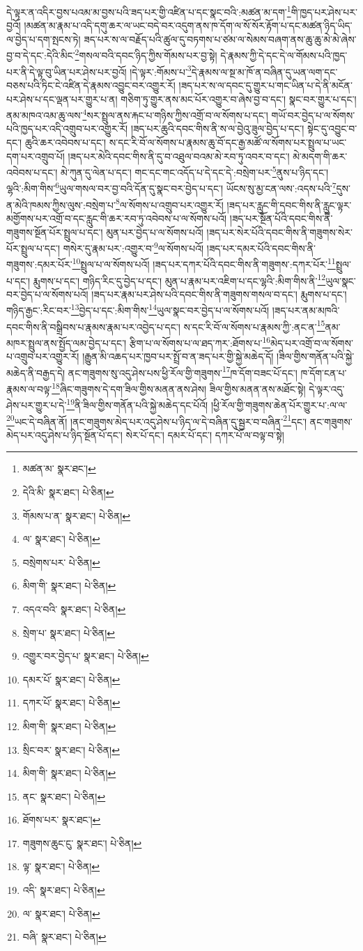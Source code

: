 དེ་ལྟར་ན་འདིར་བྱས་པའམ་མ་བྱས་པའི་ཟད་པར་གྱི་འཛིན་པ་དང་སྣང་བའི་:མཚན་མ་དག་\footnote{མཚན་མ་  སྣར་ཐང་། }གི་ཁྱད་པར་ཤེས་པར་བྱའོ། །མཚན་མ་རྣམ་པ་འདི་དགུ་ཆར་ལ་ཡང་བདེ་བར་འདུག་ནས་ཁ་དོག་ལ་སོ་སོར་རྟོག་པ་དང་མཚན་ཉིད་ཡིད་ལ་བྱེད་པ་དག་སྤངས་ཏེ། ཟད་པར་ས་ལ་བརྗོད་པའི་ཚུལ་དུ་བཏགས་པ་ཙམ་ལ་སེམས་བཞག་ནས་ཆུ་ཆུ་མེ་མེ་ཞེས་བྱ་བ་དེ་དང་:དེའི་མིང་\footnote{དེའི་མི་  སྣར་ཐང་།  པེ་ཅིན། }གསལ་བའི་དབང་ཉིད་ཀྱིས་གོམས་པར་བྱ་སྟེ། དེ་རྣམས་ཀྱི་དེ་དང་དེ་ལ་གོམས་པའི་ཁྱད་པར་ནི་དེ་ལྟ་བུ་ཡིན་པར་ཤེས་པར་བྱའོ། །དེ་ལྟར་:གོམས་པ་\footnote{གོམས་པ་ན་  སྣར་ཐང་།  པེ་ཅིན། }དེ་རྣམས་ལ་སྔ་མ་ཁོ་ན་བཞིན་དུ་ཡན་ལག་དང་བཅས་པའི་ཏིང་ངེ་འཛིན་དེ་རྣམས་འབྱུང་བར་འགྱུར་རོ། །ཟད་པར་ས་ལ་དབང་དུ་གྱུར་པ་གང་ཡིན་པ་དེ་ནི་མངོན་པར་ཤེས་པ་དང་ལྡན་པར་གྱུར་པ་ན། གཅིག་ཏུ་གྱུར་ནས་མང་པོར་འགྱུར་བ་ཞེས་བྱ་བ་དང་། སྣང་བར་གྱུར་པ་དང་། ནམ་མཁའ་འམ་ཆུ་ལས་\footnote{ལ་  སྣར་ཐང་།  པེ་ཅིན། }སར་སྤྲུལ་ནས་རྐང་པ་གཉིས་ཀྱིས་འགྲོ་བ་ལ་སོགས་པ་དང་། གཡོ་བར་བྱེད་པ་ལ་སོགས་པའི་ཁྱད་པར་འདི་འགྲུབ་པར་འགྱུར་རོ། །ཟད་པར་ཆུའི་དབང་གིས་ནི་ས་ལ་བྱེའུ་ཟུལ་བྱེད་པ་དང་། སྟེང་དུ་འབྱུང་བ་དང་། ཆུའི་ཆར་འབེབས་པ་དང་། ས་དང་རི་བོ་ལ་སོགས་པ་རྣམས་ཆུ་བོ་དང་རྒྱ་མཚོ་ལ་སོགས་པར་སྤྲུལ་པ་ཡང་དག་པར་འགྲུབ་པོ། །ཟད་པར་མེའི་དབང་གིས་ནི་དུ་བ་འཐུལ་བའམ་མེ་རབ་ཏུ་འབར་བ་དང་། མེ་མདག་གི་ཆར་འབེབས་པ་དང་། མེ་ཀུན་དུ་ལེན་པ་དང་། གང་དང་གང་འདོད་པ་དེ་དང་དེ་:བསྲེག་པར་\footnote{བསྲེགས་པར་  པེ་ཅིན། }ནུས་པ་ཉིད་དང་། ལྷའི་:མིག་གིས་\footnote{མིག་གི་  སྣར་ཐང་།  པེ་ཅིན། }ཡུལ་གསལ་བར་བྱ་བའི་དོན་དུ་སྣང་བར་བྱེད་པ་དང་། ཡོངས་སུ་མྱ་ངན་ལས་:འདས་པའི་\footnote{འདའ་བའི་  སྣར་ཐང་།  པེ་ཅིན། }དུས་ན་མེའི་ཁམས་ཀྱིས་ལུས་:བསྲེག་པ་\footnote{སྲེག་པ་  སྣར་ཐང་།  པེ་ཅིན། }ལ་སོགས་པ་འགྲུབ་པར་འགྱུར་རོ། །ཟད་པར་རླུང་གི་དབང་གིས་ནི་རླུང་ལྟར་མགྱོགས་པར་འགྲོ་བ་དང་རླུང་གི་ཆར་རབ་ཏུ་འབེབས་པ་ལ་སོགས་པའོ། །ཟད་པར་སྔོན་པོའི་དབང་གིས་ནི་གཟུགས་སྔོན་པོར་སྤྲུལ་པ་དང་། མུན་པར་བྱེད་པ་ལ་སོགས་པའོ། །ཟད་པར་སེར་པོའི་དབང་གིས་ནི་གཟུགས་སེར་པོར་སྤྲུལ་པ་དང་། གསེར་དུ་རྣམ་པར་:འགྱུར་བ་\footnote{འགྱུར་བར་བྱེད་པ་  སྣར་ཐང་།  པེ་ཅིན། }ལ་སོགས་པའོ། །ཟད་པར་དམར་པོའི་དབང་གིས་ནི་གཟུགས་:དམར་པོར་\footnote{དམར་པོ་  སྣར་ཐང་།  པེ་ཅིན། }སྤྲུལ་པ་ལ་སོགས་པའོ། །ཟད་པར་དཀར་པོའི་དབང་གིས་ནི་གཟུགས་:དཀར་པོར་\footnote{དཀར་པོ་  སྣར་ཐང་།  པེ་ཅིན། }སྤྲུལ་པ་དང་། རྨུགས་པ་དང་། གཉིད་རིང་དུ་བྱེད་པ་དང་། མུན་པ་རྣམ་པར་འཇིག་པ་དང་ལྷའི་:མིག་གིས་ནི་\footnote{མིག་གི་  སྣར་ཐང་།  པེ་ཅིན། }ཡུལ་སྣང་བར་བྱེད་པ་ལ་སོགས་པའོ། །ཟད་པར་རྣམ་པར་ཤེས་པའི་དབང་གིས་ནི་གཟུགས་གསལ་བ་དང་། རྨུགས་པ་དང་། གཉིད་རྒྱང་:རིང་བར་\footnote{སྲིང་བར་  སྣར་ཐང་།  པེ་ཅིན། }བྱེད་པ་དང་:མིག་གིས་\footnote{མིག་གི་  སྣར་ཐང་།  པེ་ཅིན། }ཡུལ་སྣང་བར་བྱེད་པ་ལ་སོགས་པའོ། །ཟད་པར་ནམ་མཁའི་དབང་གིས་ནི་བསྒྲིབས་པ་རྣམས་རྣམ་པར་འབྱེད་པ་དང་། ས་དང་རི་བོ་ལ་སོགས་པ་རྣམས་ཀྱི་:ནང་ན་\footnote{ནང་  སྣར་ཐང་།  པེ་ཅིན། }ནམ་མཁར་སྤྲུལ་ནས་སྤྱོད་ལམ་བྱེད་པ་དང་། རྩིག་པ་ལ་སོགས་པ་ལ་ཐད་ཀར་:ཐོགས་པ་\footnote{ཐོགས་པར་  སྣར་ཐང་། }མེད་པར་འགྲོ་བ་ལ་སོགས་པ་འགྲུབ་པར་འགྱུར་རོ། །རྒྱུན་མི་འཆད་པར་ཁྱབ་པར་སྤྲོ་བ་ན་ཟད་པར་གྱི་སྐྱེ་མཆེད་དོ། །ཟིལ་གྱིས་གནོན་པའི་སྐྱེ་མཆེད་ནི་བརྒྱད་དེ། ནང་གཟུགས་སུ་འདུ་ཤེས་པས་ཕྱི་རོལ་གྱི་གཟུགས་\footnote{གཟུགས་ཆུང་ངུ་  སྣར་ཐང་།  པེ་ཅིན། }ཁ་དོག་བཟང་པོ་དང་། ཁ་དོག་ངན་པ་རྣམས་ལ་བལྟ་\footnote{ལྟ་  སྣར་ཐང་།  པེ་ཅིན། }ཞིང་གཟུགས་དེ་དག་ཟིལ་གྱིས་མནན་ནས་ཤེས། ཟིལ་གྱིས་མནན་ནས་མཐོང་སྟེ། དེ་ལྟར་འདུ་ཤེས་པར་གྱུར་པ་དེ་\footnote{འདི་  སྣར་ཐང་།  པེ་ཅིན། }ནི་ཟིལ་གྱིས་གནོན་པའི་སྐྱེ་མཆེད་དང་པོའོ། །ཕྱི་རོལ་གྱི་གཟུགས་ཆེན་པོར་གྱུར་པ་:ལ་ལ་\footnote{ལ་  སྣར་ཐང་།  པེ་ཅིན། }ཡང་དེ་བཞིན་ནོ། །ནང་གཟུགས་མེད་པར་འདུ་ཤེས་པ་ཉིད་ལ་དེ་བཞིན་དུ་སྦྱར་བ་བཞིན་\footnote{བཞི་  སྣར་ཐང་།  པེ་ཅིན། }དང་། ནང་གཟུགས་མེད་པར་འདུ་ཤེས་པ་ཉིད་སྔོན་པོ་དང་། སེར་པོ་དང་། དམར་པོ་དང་། དཀར་པོ་ལ་བལྟ་བ་སྟེ། 